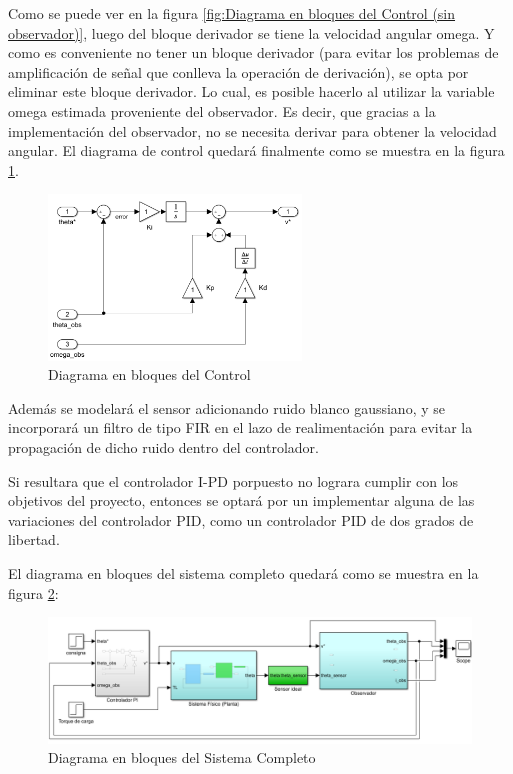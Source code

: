 \documentclass{article}
\begin{document}
Como se puede ver en la figura \ref{fig:Diagrama en bloques del Control (sin observador)}, luego del bloque derivador se tiene la velocidad angular omega. Y como es conveniente no tener un bloque derivador (para evitar los problemas de amplificación de señal que conlleva la operación de derivación), se opta por eliminar este bloque derivador. Lo cual, es posible hacerlo al utilizar la variable omega estimada proveniente del observador. Es decir, que gracias a la implementación del observador, no se necesita derivar para obtener la velocidad angular. El diagrama de control quedará finalmente como se muestra en la figura \ref{fig:Diagrama en bloques del Control}.

\begin{figure}[H]
    \centering
    \includegraphics[width=0.60\textwidth]{Diagrama en bloques del Control}
    \caption{Diagrama en bloques del Control}
    \label{fig:Diagrama en bloques del Control}
\end{figure}

Además se modelará el sensor adicionando ruido blanco gaussiano, y se incorporará un filtro de tipo FIR en el lazo de realimentación para evitar la propagación de dicho ruido dentro del controlador.

Si resultara que el controlador I-PD porpuesto no lograra cumplir con los objetivos del proyecto, entonces se optará por un implementar alguna de las variaciones del controlador PID, como un controlador PID de dos grados de libertad.

El diagrama en bloques del sistema completo quedará como se muestra en la figura \ref{fig:Diagrama en bloques del Sistema Completo}:

\begin{figure}[H]
    \centering
    \includegraphics[width=1.1\textwidth]{Diagrama en bloques del Sistema Completo}
    \caption{Diagrama en bloques del Sistema Completo}
    \label{fig:Diagrama en bloques del Sistema Completo}
\end{figure}
\end{document}
